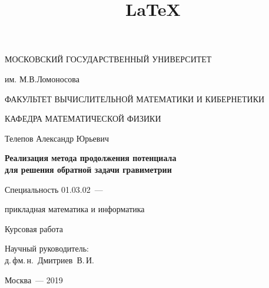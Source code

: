 \documentclass[12pt]{article}
\title{\LaTeX}
\date{}
\author{}
\begin{document}
\centerline{МОСКОВСКИЙ ГОСУДАРСТВЕННЫЙ УНИВЕРСИТЕТ}
\centerline{им. М.В.Ломоносова}
\centerline{ФАКУЛЬТЕТ ВЫЧИСЛИТЕЛЬНОЙ МАТЕМАТИКИ И КИБЕРНЕТИКИ}
\vfill
\centerline{КАФЕДРА МАТЕМАТИЧЕСКОЙ ФИЗИКИ}
\vfill
\vfill
\vfill
\large
\centerline{{Телепов} Александр Юрьевич}
\vfill
\Large
\begin{centering}
{\bf Реализация метода продолжения потенциала \\
для решения обратной задачи гравиметрии\\}
\end{centering}
\normalsize
\vfill
\centerline{Специальность 01.03.02~--- }
\centerline{прикладная математика и информатика}
\vfill
\centerline{Курсовая работа}
\vfill
\vfill
\begin{flushright}
Научный руководитель:\\
д.\,фм.\,н.~Дмитриев~В.\,И.
\end{flushright}
\vfill
\vfill
\centerline{Москва~--- 2019}
\clearpage

\end{document}
